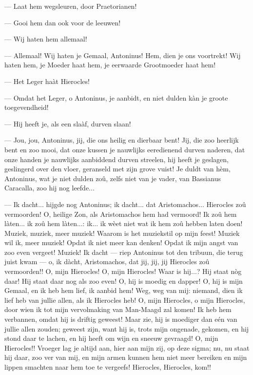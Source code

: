 \documentclass[a4paper, 12pt, oneside, dutch]{article}
\begin{document}
--- Laat hem wegsleuren, door Praetorianen!

--- Gooi hem dan ook voor de leeuwen!

--- Wij haten hem allemaal!

--- Allemaal! Wij haten je Gemaal, Antoninus! Hem, dien je ons voortrekt! Wij haten hem, je Moeder haat hem, je eerwaarde Grootmoeder haat hem!

--- Het Leger haàt Hierocles!

--- Omdat het Leger, o Antoninus, je aanbidt, en niet dulden kàn je groote toegevendheid!

--- Hij heeft je, als een slaàf, durven slaan!

--- Jou, jou, Antoninus, jij, die ons heilig en dierbaar bent! Jij, die zoo heerlijk bent en zoo mooi, dat onze kussen je nauwlijks eeredienend durven naderen, dat onze handen je nauwlijks aanbiddend durven streelen, hij heeft je geslagen, geslingerd over den vloer, geranseld met zijn grove vuist! Je duldt van hèm, Antoninus, wat je niet dulden zoû, zelfs niet van je vader, van Bassianus Caracalla, zoo hij nog leefde...

--- Ik dacht... hijgde nog Antoninus; ik dacht... dat Aristomachos... Hierocles zoû vermoorden! O, heilige Zon, als Aristomachos hem had vermoord! Ik zoû hem làten... ik zoû hem làten...: ik... ik wèet niet wat ik hem zoû hebben laten doen! Muziek, muziek, meer muziek! Waarom is het muziekstil op mijn feest! Muziek wil ik, meer muziek! Opdat ik niet meer kan denken! Opdat ik mijn angst van zoo even vergeet! Muziek! Ik dacht --- riep Antoninus tot den tribuun, die terug juist kwam --- o, ik dàcht, Aristomachos, dat jij, jij, jij Hierocles zoû vermoorden!! O, mijn Hierocles! O, mijn Hierocles! Waar is hij...? Hij staat nòg daar! Hij staat daar nog als zoo even! O, hij is moedig en dapper! O, hij is mijn Gemaal, en ik heb hem lief, ik aanbid hem! Weg, weg van mij: niemand, dien ik lief heb van jullie allen, als ik Hierocles heb! O, mijn Hierocles, o mijn Hierocles, door wien ik tot mijn vervolmaking van Man-Maagd zal komen! Ik heb hem verbannen, omdat hij is driftig geweest! Maar zie, hij is moediger dan eén van jullie allen zouden; geweest zijn, want hij is, trots mijn ongenade, gekomen, en hij stond daar te lachen, en hij heeft om wijn en sneeuw gevraagd! O, mijn Hierocles!! Vroeger lag je altijd aan, hier aan mijn zij, op deze sigma; nu, nu staat hij daar, zoo ver van mij, en mijn armen kunnen hem niet meer bereiken en mijn lippen smachten naar hem toe te vergeefs! Hierocles, Hierocles, kom!!
\end{document}
